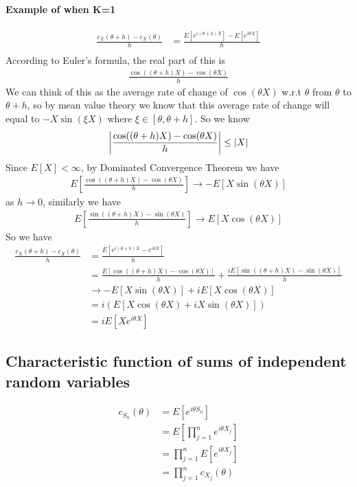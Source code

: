 \paragraph{Example of when K=1}
\begin{align*}
    \frac{c_X(\theta + h) - c_X(\theta)}{h}
    & = \frac{E[e^{i (\theta + h) X}] - E[e^{i \theta X}]}{h}\\
\end{align*}
According to Euler's formula, the real part of this is 
    \begin{align*}
        \frac{\cos((\theta+h)X) - \cos(\theta X)}{h}
    \end{align*}
We can think of this as the average rate of change of $\cos(\theta X)$ w.r.t $\theta$ from $\theta$ to $\theta + h$, so by mean value theory we know that this average rate of change will equal to $-X \sin (\xi X)$ where $\xi \in [\theta, \theta+h]$. So we know 
    \begin{align*}
        \left|  \frac{\cos((\theta+h)X) - \cos(\theta X)}{h} \right| \leq \left| X \right|
    \end{align*}
Since $E[X] < \infty$, by Dominated Convergence Theorem we have 
    \begin{align*}
        E\left[ \frac{\cos((\theta+h)X) - \cos(\theta X)}{h} \right] \to -E[X\sin(\theta X)]
    \end{align*}
as $h \to 0$, similarly we have 
    \begin{align*}
        E\left[ \frac{\sin((\theta+h)X) - \sin(\theta X)}{h} \right] \to E[X\cos(\theta X)]
    \end{align*}
So we have 
    \begin{align*}
        \frac{c_X(\theta + h) - c_X(\theta)}{h}
        & = \frac{E\left[e^{i (\theta + h) X} - e^{i\theta X} \right]}{h} \\
        & = \frac{E\left[\cos((\theta+h)X) - \cos(\theta X) \right]}{h} + \frac{i E\left[\sin((\theta+h)X) - \sin(\theta X) \right]}{h} \\
        & \to -E[X \sin(\theta X)] + i E[X \cos(\theta X)]\\
        & = i ( E[ X \cos(\theta X) + i X \sin(\theta X)])\\
        & =i E[X e^{i \theta X}]
    \end{align*}
    
\subsection{Characteristic function of sums of independent random variables}
    \begin{align*}
        c_{S_n}(\theta) 
        & = E[e^{i \theta S_n}]\\
        & = E[\prod_{j=1}^n e^{i \theta X_j}] \\
        & = \prod_{j=1}^n E[e^{i \theta X_j}] \tag{By independence} \\
        & = \prod_{j=1}^n c_{X_j}(\theta)
    \end{align*}
    
